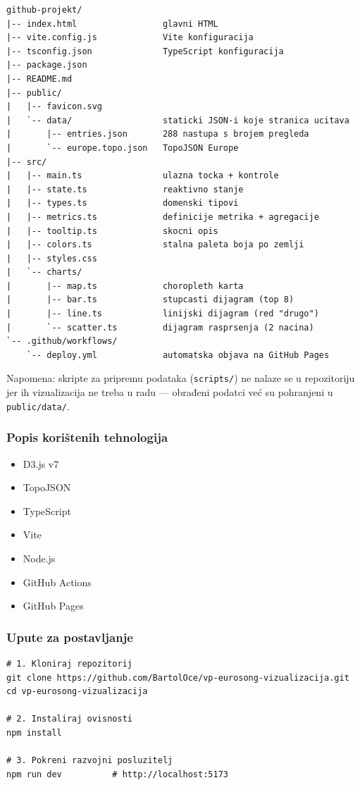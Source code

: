 \documentclass[a4paper,11pt]{article}
\begin{document}
\begin{lstlisting}
github-projekt/
|-- index.html                 glavni HTML
|-- vite.config.js             Vite konfiguracija
|-- tsconfig.json              TypeScript konfiguracija
|-- package.json
|-- README.md
|-- public/
|   |-- favicon.svg
|   `-- data/                  staticki JSON-i koje stranica ucitava
|       |-- entries.json       288 nastupa s brojem pregleda
|       `-- europe.topo.json   TopoJSON Europe
|-- src/
|   |-- main.ts                ulazna tocka + kontrole
|   |-- state.ts               reaktivno stanje
|   |-- types.ts               domenski tipovi
|   |-- metrics.ts             definicije metrika + agregacije
|   |-- tooltip.ts             skocni opis
|   |-- colors.ts              stalna paleta boja po zemlji
|   |-- styles.css
|   `-- charts/
|       |-- map.ts             choropleth karta
|       |-- bar.ts             stupcasti dijagram (top 8)
|       |-- line.ts            linijski dijagram (red "drugo")
|       `-- scatter.ts         dijagram rasprsenja (2 nacina)
`-- .github/workflows/
    `-- deploy.yml             automatska objava na GitHub Pages
\end{lstlisting}

Napomena: skripte za pripremu podataka (\texttt{scripts/}) ne nalaze se u repozitoriju jer ih vizualizacija ne treba u radu --- obrađeni podatci već su pohranjeni u \texttt{public/data/}.

\subsubsection*{Popis korištenih tehnologija}

\begin{itemize}
  \item D3.js v7
  \item TopoJSON
  \item TypeScript
  \item Vite
  \item Node.js
  \item GitHub Actions
  \item GitHub Pages
\end{itemize}

\subsubsection*{Upute za postavljanje}

\begin{lstlisting}
# 1. Kloniraj repozitorij
git clone https://github.com/BartolOce/vp-eurosong-vizualizacija.git
cd vp-eurosong-vizualizacija

# 2. Instaliraj ovisnosti
npm install

# 3. Pokreni razvojni posluzitelj
npm run dev          # http://localhost:5173
\end{lstlisting}
\end{document}

